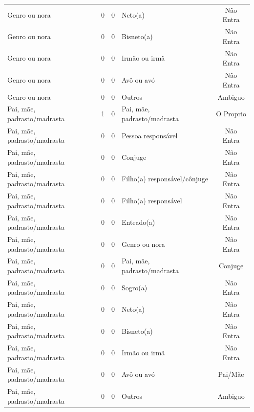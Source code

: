 \documentclass[
	12pt,				%
	openright,			%
	twoside,			%
	a4paper,			%
	english,			%
	french,				%
	spanish,			%
	brazil				%
	]{abntex2}
\begin{document}
\begin{anexosenv}
\begin{longtable}{@{}lcclc@{}}
Genro ou nora                & 0         & 0        & Neto(a)                      & Não Entra       \\
Genro ou nora                & 0         & 0        & Bisneto(a)                   & Não Entra       \\
Genro ou nora                & 0         & 0        & Irmão ou irmã                & Não Entra       \\
Genro ou nora                & 0         & 0        & Avô ou avó                   & Não Entra       \\
Genro ou nora                & 0         & 0        & Outros                       & Ambiguo         \\
Pai, mãe, padrasto/madrasta  & 1         & 0        & Pai, mãe, padrasto/madrasta  & O Proprio       \\
Pai, mãe, padrasto/madrasta  & 0         & 0        & Pessoa responsável           & Não Entra       \\
Pai, mãe, padrasto/madrasta  & 0         & 0        & Conjuge                      & Não Entra       \\
Pai, mãe, padrasto/madrasta  & 0         & 0        & Filho(a) responsável/cônjuge & Não Entra       \\
Pai, mãe, padrasto/madrasta  & 0         & 0        & Filho(a) responsável         & Não Entra       \\
Pai, mãe, padrasto/madrasta  & 0         & 0        & Enteado(a)                   & Não Entra       \\
Pai, mãe, padrasto/madrasta  & 0         & 0        & Genro ou nora                & Não Entra       \\
Pai, mãe, padrasto/madrasta  & 0         & 0        & Pai, mãe, padrasto/madrasta  & Conjuge         \\
Pai, mãe, padrasto/madrasta  & 0         & 0        & Sogro(a)                     & Não Entra       \\
Pai, mãe, padrasto/madrasta  & 0         & 0        & Neto(a)                      & Não Entra       \\
Pai, mãe, padrasto/madrasta  & 0         & 0        & Bisneto(a)                   & Não Entra       \\
Pai, mãe, padrasto/madrasta  & 0         & 0        & Irmão ou irmã                & Não Entra       \\
Pai, mãe, padrasto/madrasta  & 0         & 0        & Avô ou avó                   & Pai/Mãe         \\
Pai, mãe, padrasto/madrasta  & 0         & 0        & Outros                       & Ambiguo         \\

\end{longtable}
\end{anexosenv}
\end{document}
